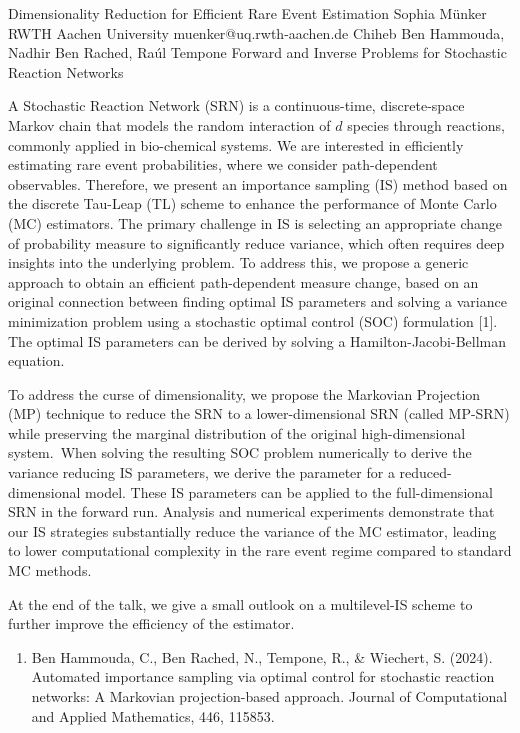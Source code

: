 \begin{talk}
  {Dimensionality Reduction for Efficient Rare Event Estimation}%
  {Sophia M\"unker}%
  {RWTH Aachen University}%
  {muenker@uq.rwth-aachen.de}%
  {Chiheb Ben Hammouda, Nadhir Ben Rached, Ra\'ul Tempone}%
  {Forward and Inverse Problems for Stochastic Reaction Networks}%
    
   
A Stochastic Reaction Network (SRN) is a continuous-time, discrete-space Markov chain that models the random interaction of $d$ species through reactions, commonly applied in bio-chemical systems. We are interested in efficiently estimating rare event probabilities, where we consider path-dependent observables. Therefore, we present an importance sampling (IS) method based on the discrete Tau-Leap (TL) scheme to enhance the performance of Monte Carlo (MC) estimators. The primary challenge in IS is selecting an appropriate change of probability measure to significantly reduce variance, which often requires deep insights into the underlying problem. To address this, we propose a generic approach to obtain an efficient path-dependent measure change, based on an original connection between finding optimal IS parameters and solving a variance minimization problem using a stochastic optimal control (SOC) formulation [1]. The optimal IS parameters can be derived by solving a Hamilton-Jacobi-Bellman equation.

To address the curse of dimensionality, we propose the Markovian Projection (MP) technique to reduce the SRN to a lower-dimensional SRN (called MP-SRN) while preserving the marginal distribution of the original high-dimensional system. When solving the resulting SOC problem numerically to derive the variance reducing IS parameters, we derive the parameter for a reduced-dimensional model. These IS parameters can be applied to the full-dimensional SRN in the forward run. Analysis and numerical experiments demonstrate that our IS strategies substantially reduce the variance of the MC estimator, leading to lower computational complexity in the rare event regime compared to standard MC methods. 

At the end of the talk, we give a small outlook on a multilevel-IS scheme to further improve the efficiency of the estimator.


\begin{enumerate}
   \item[{[1]}] Ben Hammouda, C., Ben Rached, N., Tempone, R., \& Wiechert, S. (2024). Automated importance sampling via optimal control for stochastic reaction networks: A Markovian projection-based approach. Journal of Computational and Applied Mathematics, 446, 115853.
\end{enumerate}

\medskip
\end{talk}

